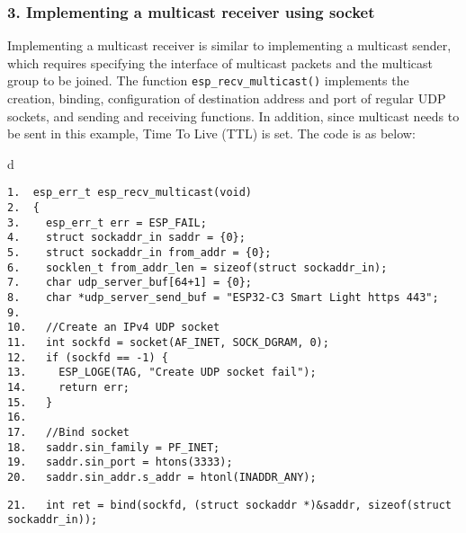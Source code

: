 \documentclass[a4paper,12pt]{book}
\begin{document}
\subsubsection{3. Implementing a multicast receiver using socket}

Implementing a multicast receiver is similar to implementing a multicast sender, which requires specifying the interface of multicast packets and the multicast group to be joined. The function \verb|esp_recv_multicast()| implements the creation, binding, configuration of destination address and port of regular UDP sockets, and sending and receiving functions. In addition, since multicast needs to be sent in this example, Time To Live (TTL) is set. The code is as below:

\begin{codebloc}
\begin{tabular}{d}
\vspace{2pt}
\begin{verbatim}
1.  esp_err_t esp_recv_multicast(void)
2.  {
3.    esp_err_t err = ESP_FAIL;
4.    struct sockaddr_in saddr = {0};
5.    struct sockaddr_in from_addr = {0};
6.    socklen_t from_addr_len = sizeof(struct sockaddr_in);
7.    char udp_server_buf[64+1] = {0};
8.    char *udp_server_send_buf = "ESP32-C3 Smart Light https 443";
9.	
10.   //Create an IPv4 UDP socket
11.   int sockfd = socket(AF_INET, SOCK_DGRAM, 0);
12.   if (sockfd == -1) {
13.     ESP_LOGE(TAG, "Create UDP socket fail");
14.     return err;
15.   }
16.	
17.   //Bind socket
18.   saddr.sin_family = PF_INET;
19.   saddr.sin_port = htons(3333);
20.   saddr.sin_addr.s_addr = htonl(INADDR_ANY);
\end{verbatim}
\verb|21.   |\fontsize{9.5pt}{10pt}\selectfont\verb|int ret = bind(sockfd, (struct sockaddr *)&saddr, sizeof(struct sockaddr_in));|
\end{tabular}
\end{codebloc}
\end{document}
